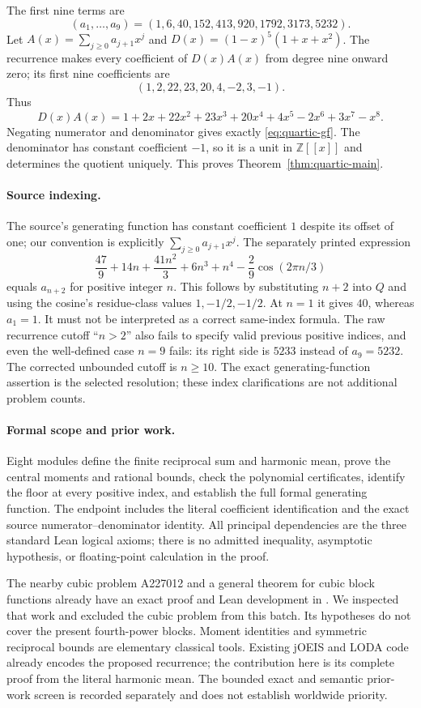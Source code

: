 \documentclass[11pt]{article}
\begin{document}
The first nine terms are
\[
 (a_1,\ldots,a_9)=(1,6,40,152,413,920,1792,3173,5232).
\]
Let $A(x)=\sum_{j\ge0}a_{j+1}x^j$ and
$D(x)=(1-x)^5(1+x+x^2)$.
The recurrence makes every coefficient of $D(x)A(x)$ from degree nine
onward zero; its first nine coefficients are
\[
 (1,2,22,23,20,4,-2,3,-1).
\]
Thus
\[
 D(x)A(x)=1+2x+22x^2+23x^3+20x^4+4x^5-2x^6+3x^7-x^8.
\]
Negating numerator and denominator gives exactly
\eqref{eq:quartic-gf}. The denominator has constant coefficient $-1$,
so it is a unit in $\mathbb Z[[x]]$ and determines the quotient uniquely.
This proves Theorem~\ref{thm:quartic-main}.

\paragraph{Source indexing.}
The source's generating function has constant coefficient $1$ despite
its offset of one; our convention is explicitly $\sum_{j\ge0}a_{j+1}x^j$.
The separately printed expression
\[
 \frac{47}{9}+14n+\frac{41n^2}{3}+6n^3+n^4
       -\frac29\cos(2\pi n/3)
\]
equals $a_{n+2}$ for positive integer $n$. This follows by substituting
$n+2$ into $Q$ and using the cosine's residue-class values $1,-1/2,-1/2$.
At $n=1$ it gives $40$, whereas $a_1=1$. It must not be interpreted
as a correct same-index formula. The raw recurrence cutoff ``$n>2$''
also fails to specify valid previous positive indices, and even the
well-defined case $n=9$ fails: its right side is $5233$ instead of
$a_9=5232$. The corrected unbounded cutoff is $n\ge10$.
The exact generating-function assertion is the selected resolution;
these index clarifications are not additional problem counts.

\paragraph{Formal scope and prior work.}
Eight modules define the finite reciprocal sum and harmonic mean,
prove the central moments and rational bounds, check the polynomial
certificates, identify the floor at every positive index, and establish
the full formal generating function. The endpoint
 includes the literal coefficient
identification and the exact source numerator--denominator identity.
All principal dependencies are the three standard Lean logical axioms;
there is no admitted inequality, asymptotic hypothesis, or floating-point
calculation in the proof.

The nearby cubic problem A227012 and a general theorem for cubic block
functions already have an exact proof and Lean development in
 \cite{prior-cubic-harmonic}.
We inspected that work and excluded the cubic problem from this batch.
Its hypotheses do not cover the present fourth-power blocks.
Moment identities and symmetric reciprocal bounds are elementary
classical tools. Existing jOEIS and LODA code already encodes the proposed
recurrence; the contribution here is its complete proof from the literal
harmonic mean. The bounded exact and semantic prior-work screen is
recorded separately and does not establish worldwide priority.
\end{document}
